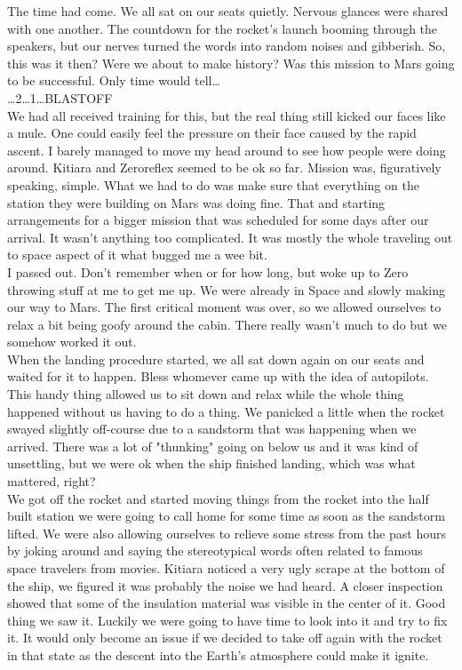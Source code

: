 \documentclass[a4paper,onecolumn,11pt]{article}
\begin{document}
The time had come. We all sat on our seats quietly. Nervous glances were shared with one another. The countdown for the rocket's launch booming through the speakers, but our nerves turned the words into random noises and gibberish. So, this was it then? Were we about to make history? Was this mission to Mars going to be successful. Only time would tell\ldots \\
\ldots 2\ldots 1\ldots \textsc{BLASTOFF}\\
\newline
We had all received training for this, but the real thing still kicked our faces like a mule. One could easily feel the pressure on their face caused by the rapid ascent. I barely managed to move my head around to see how people were doing around. Kitiara and Zeroreflex seemed to be ok so far. Mission was, figuratively speaking, simple. What we had to do was make sure that everything on the station they were building on Mars was doing fine. That and starting arrangements for a bigger mission that was scheduled for some days after our arrival. It wasn't anything too complicated. It was mostly the whole traveling out to space aspect of it what bugged me a wee bit.\\
\newline
I passed out. Don't remember when or for how long, but woke up to Zero throwing stuff at me to get me up. We were already in Space and slowly making our way to Mars. The first critical moment was over, so we allowed ourselves to relax a bit being goofy around the cabin. There really wasn't much to do but we somehow worked it out.\\
\newline
When the landing procedure started, we all sat down again on our seats and waited for it to happen. Bless whomever came up with the idea of autopilots. This handy thing allowed us to sit down and relax while the whole thing happened without us having to do a thing. We panicked a little when the rocket swayed slightly off-course due to a sandstorm that was happening when we arrived. There was a lot of "thunking" going on below us and it was kind of unsettling, but we were ok when the ship finished landing, which was what mattered, right?\\
\newline
We got off the rocket and started moving things from the rocket into the half built station we were going to call home for some time as soon as the sandstorm lifted. We were also allowing ourselves to relieve some stress from the past hours by joking around and saying the stereotypical words often related to famous space travelers from movies. Kitiara noticed a very ugly scrape at the bottom of the ship, we figured it was probably the noise we had heard. A closer inspection showed that some of the insulation material was visible in the center of it. Good thing we saw it. Luckily we were going to have time to look into it and try to fix it. It would only become an issue if we decided to take off again with the rocket in that state as the descent into the Earth's atmosphere could make it ignite.\\
\end{document}
